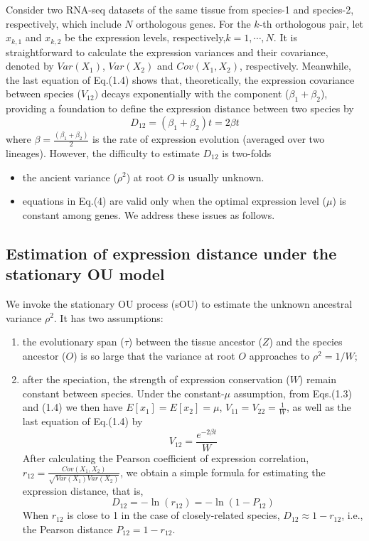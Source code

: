 \documentclass[]{book}
\providecommand{\tightlist}{%
  \setlength{\itemsep}{0pt}\setlength{\parskip}{0pt}}
\begin{document}
Consider two RNA-seq datasets of the same tissue from species-1 and species-2, respectively, which include \(N\) orthologous genes. For the \(k\)-th orthologous pair, let \(x_{k,1}\) and \(x_{k,2}\) be the expression levels, respectively,\(k=1,\cdots,N\). It is straightforward to calculate the expression variances and their covariance, denoted by \(Var(X_1)\), \(Var(X_2)\) and \(Cov(X_1, X_2)\), respectively. Meanwhile, the last equation of Eq.(1.4) shows that, theoretically, the expression covariance between species (\(V_{12})\) decays exponentially with the component (\(\beta_1+\beta_2\)), providing a foundation to define the expression distance between two species by
\[D_{12}=\left(\beta_1+\beta_2\right)t=2\beta t\tag{1.5}\]
where \(\beta=\frac{\left(\beta_1+\beta_2\right)}{2}\) is the rate of expression evolution (averaged over two lineages). However, the difficulty to estimate \(D_{12}\) is two-folds

\begin{itemize}
\tightlist
\item
  the ancient variance (\(\rho^2\)) at root \(O\) is usually unknown.
\item
  equations in Eq.(4) are valid only when the optimal expression level (\(\mu\)) is constant among genes. We address these issues as follows.
\end{itemize}

\hypertarget{estimation-of-expression-distance-under-the-stationary-ou-model}{%
\subsection{Estimation of expression distance under the stationary OU model}\label{estimation-of-expression-distance-under-the-stationary-ou-model}}

We invoke the stationary OU process (sOU) to estimate the unknown ancestral variance \(\rho^2\). It has two assumptions:

\begin{enumerate}
\def\labelenumi{\arabic{enumi}.}
\tightlist
\item
  the evolutionary span (\(\tau\)) between the tissue ancestor (\(Z\)) and the species ancestor (\(O\)) is so large that the variance at root \(O\) approaches to \(\rho^2=1/W\);
\item
  after the speciation, the strength of expression conservation (\(W\)) remain constant between species. Under the constant-\(\mu\) assumption, from Eqs.(1.3) and (1.4) we then have \(E\left[x_1\right]=E\left[x_2\right]=\mu\), \(V_{11}=V_{22}=\frac{1}{W}\), as well as the last equation of Eq.(1.4) by
  \[V_{12}=\frac{e^{-2\beta t}}{W}\tag{1.6}\]
  After calculating the Pearson coefficient of expression correlation, \(r_{12}=\frac{Cov\left(X_1,X_2\right)}{\sqrt{Var\left(X_1\right)Var\left(X_2\right)}}\), we obtain a simple formula for estimating the expression distance, that is,
  \[D_{12}=-\ln\left(r_{12}\right)=-\ln\left(1-P_{12}\right)\tag{1.7}\]
  When \(r_{12}\) is close to 1 in the case of closely-related species, \(D_{12} \approx 1- r_{12}\), i.e., the Pearson distance \(P_{12}=1- r_{12}\).
\end{enumerate}
\end{document}
